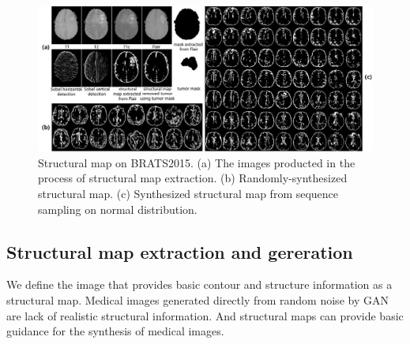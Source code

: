 \documentclass[runningheads]{llncs}
\begin{document}
	\begin{figure}[thbp!]
		\centering
		\includegraphics[width=0.9\linewidth]{figures/brats_f}
		\caption{Structural map on BRATS2015. (a) The images producted in the process of structural map extraction. (b) Randomly-synthesized structural map. (c) Synthesized structural map from sequence sampling on normal distribution.}
		\label{generated_f}
	\end{figure}
	\subsection{Structural map extraction and gereration}
	We define the image that provides basic contour and structure information as a structural map. Medical images generated directly from random noise by GAN are lack of realistic structural information. And structural maps can provide basic guidance for the synthesis of medical images.
	
\end{document}
